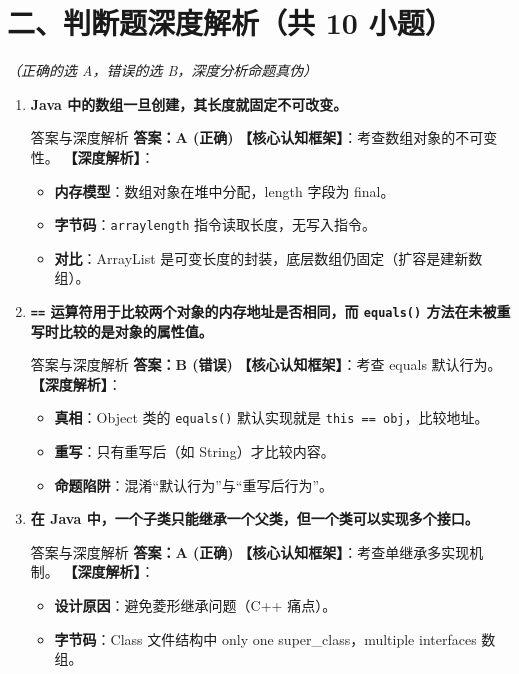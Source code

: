 ﻿\documentclass[12pt, a4paper]{ctexart}
\newcommand{\code}[1]{\texttt{#1}}
\begin{document}
\section*{二、判断题深度解析（共 10 小题）}
\textit{（正确的选 A，错误的选 B，深度分析命题真伪）}

\begin{enumerate}[label=\textbf{\arabic*.}, leftmargin=*, itemsep=1.5em]
	\item \textbf{Java 中的数组一旦创建，其长度就固定不可改变。}
	      \begin{bluebox}{答案与深度解析}
		      \textbf{答案：A (正确)}
		      \textbf{【核心认知框架】}：考查数组对象的不可变性。
		      \textbf{【深度解析】}：
		      \begin{itemize}[leftmargin=*, nosep]
			      \item \textbf{内存模型}：数组对象在堆中分配，length 字段为 final。
			      \item \textbf{字节码}：\code{arraylength} 指令读取长度，无写入指令。
			      \item \textbf{对比}：ArrayList 是可变长度的封装，底层数组仍固定（扩容是建新数组）。
		      \end{itemize}
	      \end{bluebox}

	\item \textbf{\code{==} 运算符用于比较两个对象的内存地址是否相同，而 \code{equals()} 方法在未被重写时比较的是对象的属性值。}
	      \begin{bluebox}{答案与深度解析}
		      \textbf{答案：B (错误)}
		      \textbf{【核心认知框架】}：考查 equals 默认行为。
		      \textbf{【深度解析】}：
		      \begin{itemize}[leftmargin=*, nosep]
			      \item \textbf{真相}：Object 类的 \code{equals()} 默认实现就是 \code{this == obj}，比较地址。
			      \item \textbf{重写}：只有重写后（如 String）才比较内容。
			      \item \textbf{命题陷阱}：混淆“默认行为”与“重写后行为”。
		      \end{itemize}
	      \end{bluebox}

	\item \textbf{在 Java 中，一个子类只能继承一个父类，但一个类可以实现多个接口。}
	      \begin{bluebox}{答案与深度解析}
		      \textbf{答案：A (正确)}
		      \textbf{【核心认知框架】}：考查单继承多实现机制。
		      \textbf{【深度解析】}：
		      \begin{itemize}[leftmargin=*, nosep]
			      \item \textbf{设计原因}：避免菱形继承问题（C++ 痛点）。
			      \item \textbf{字节码}：Class 文件结构中 only one super\_class，multiple interfaces 数组。
		      \end{itemize}
	      \end{bluebox}


\end{enumerate}
\end{document}
